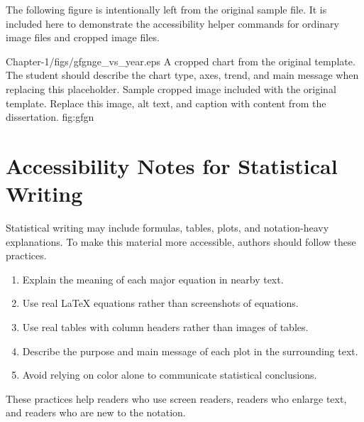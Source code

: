 The following figure is intentionally left from the original sample file. It is included here to demonstrate the accessibility helper commands for ordinary image files and cropped image files. 

\accessiblefigurecropped[htbp][\textwidth]
  {4cm 8.5cm 3cm 0cm}
  {Chapter-1/figs/gfgnge_vs_year.eps}
  {A cropped chart from the original template. The student should describe the chart type, axes, trend, and main message when replacing this placeholder.}
  {Sample cropped image included with the original template. Replace this image, alt text, and caption with content from the dissertation.}
  {fig:gfgn}

\section{Accessibility Notes for Statistical Writing}
\label{sec:clt-accessibility-notes}

Statistical writing may include formulas, tables, plots, and notation-heavy explanations. To make this material more accessible, authors should follow these practices.

\begin{enumerate}
  \item Explain the meaning of each major equation in nearby text.
  \item Use real LaTeX equations rather than screenshots of equations.
  \item Use real tables with column headers rather than images of tables.
  \item Describe the purpose and main message of each plot in the surrounding text.
  \item Avoid relying on color alone to communicate statistical conclusions.
\end{enumerate}

These practices help readers who use screen readers, readers who enlarge text, and readers who are new to the notation.